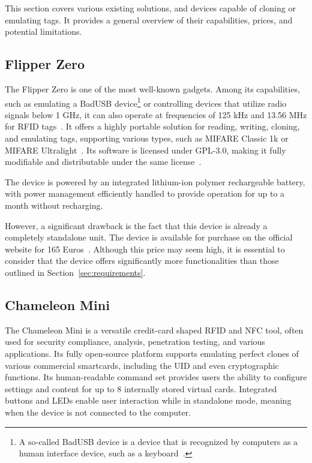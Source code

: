 This section covers various existing solutions, and devices capable of cloning or emulating tags. It provides a general overview of their capabilities, prices, and potential limitations.

\subsection{Flipper Zero}

The Flipper Zero is one of the most well-known gadgets. Among its capabilities, such as emulating a BadUSB device\footnote{A so-called BadUSB device is a device that is recognized by computers as a human interface device, such as a keyboard~\cite{badusb}.} or controlling devices that utilize radio signals below 1 GHz, it can also operate at frequencies of 125 kHz and 13.56 MHz for RFID tags~\cite{flipper}. It offers a highly portable solution for reading, writing, cloning, and emulating tags, supporting various types, such as MIFARE Classic 1k or MIFARE Ultralight~\cite{flipperreading}.  Its software is licensed under GPL-3.0, making it fully modifiable and distributable under the same license~\cite{githubflipper}.

The device is powered by an integrated lithium-ion polymer rechargeable battery, with power management efficiently handled to provide operation for up to a month without recharging.~\cite{flipperpower}

However, a significant drawback is the fact that this device is already a completely standalone unit. The device is available for purchase on the official website for 165 Euros~\cite{flippershop}. Although this price may seem high, it is essential to consider that the device offers significantly more functionalities than those outlined in Section~\ref{sec:requirements}.


\subsection{Chameleon Mini}

The Chameleon Mini is a versatile credit-card shaped RFID and NFC tool, often used for security compliance, analysis, penetration testing, and various applications. Its fully open-source platform supports emulating perfect clones of various commercial smartcards, including the UID and even cryptographic functions. Its human-readable command set provides users the ability to configure settings and content for up to 8 internally stored virtual cards. Integrated buttons and LEDs enable user interaction while in standalone mode, meaning when the device is not connected to the computer.~\cite{chameleonwiki}

